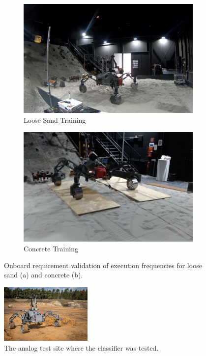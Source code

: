 \documentclass{article}
\begin{document}
\begin{figure}[!t]
    \centering
    \begin{subfigure}[t]{0.4\textwidth}
        \includegraphics[width=\textwidth]{../figures/spacehall.png}
        \caption{Loose Sand Training}
    \end{subfigure}
    \begin{subfigure}[t]{0.4\textwidth}
        \includegraphics[width=\textwidth]{../figures/spacehallconcrete.png}
        \caption{Concrete Training}
    \end{subfigure}
    \caption{Onboard requirement validation of execution frequencies for loose sand (a) and concrete (b).}
    \label{fig:sh-tests}
\end{figure}

\begin{figure}[!htb]
    \centering
        \includegraphics[width=0.4\textwidth]{../figures/sandmine_v2.jpg}
    \caption{The analog test site where the classifier was tested.}
    \label{fig:finaltest}
\end{figure}
\end{document}
